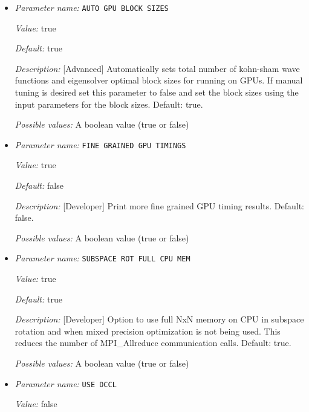 \begin{itemize}
\item {\it Parameter name:} {\tt AUTO GPU BLOCK SIZES}
\label{parameters:GPU/AUTO GPU BLOCK SIZES}
\label{parameters:GPU/AUTO_20GPU_20BLOCK_20SIZES}


{\it Value:} true


{\it Default:} true


{\it Description:} [Advanced] Automatically sets total number of kohn-sham wave functions and eigensolver optimal block sizes for running on GPUs. If manual tuning is desired set this parameter to false and set the block sizes using the input parameters for the block sizes. Default: true.


{\it Possible values:} A boolean value (true or false)
\item {\it Parameter name:} {\tt FINE GRAINED GPU TIMINGS}
\label{parameters:GPU/FINE GRAINED GPU TIMINGS}
\label{parameters:GPU/FINE_20GRAINED_20GPU_20TIMINGS}


{\it Value:} true


{\it Default:} false


{\it Description:} [Developer] Print more fine grained GPU timing results. Default: false.


{\it Possible values:} A boolean value (true or false)
\item {\it Parameter name:} {\tt SUBSPACE ROT FULL CPU MEM}
\label{parameters:GPU/SUBSPACE ROT FULL CPU MEM}
\label{parameters:GPU/SUBSPACE_20ROT_20FULL_20CPU_20MEM}


{\it Value:} true


{\it Default:} true


{\it Description:} [Developer] Option to use full NxN memory on CPU in subspace rotation and when mixed precision optimization is not being used. This reduces the number of MPI\_Allreduce communication calls. Default: true.


{\it Possible values:} A boolean value (true or false)
\item {\it Parameter name:} {\tt USE DCCL}
\label{parameters:GPU/USE DCCL}
\label{parameters:GPU/USE_20DCCL}


{\it Value:} false



\end{itemize}
